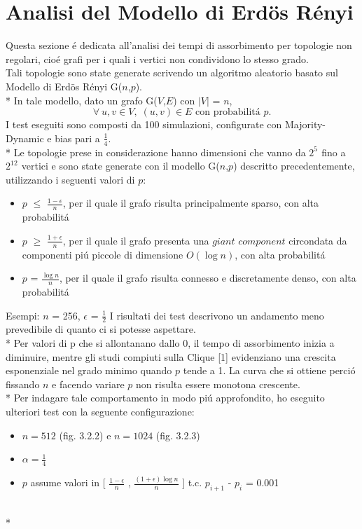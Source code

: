 \documentclass[../Tesi.tex]{subfiles}
\begin{document}
\section{Analisi del Modello di Erd{\"o}s R\'enyi}
Questa sezione \'e dedicata all'analisi dei tempi di assorbimento per topologie non regolari, cio\'e grafi per i quali i vertici non condividono lo stesso grado.\\
Tali topologie sono state generate scrivendo un algoritmo aleatorio basato sul Modello di Erd{\"o}s R\'enyi G($n$,$p$).\\*
In tale modello, dato un grafo G($V$,$E$) con $|V|$ = $n$,
\begin{equation}
    \forall \: u,v \in V,\; (u,v) \in E  \text{ con probabilit\'a } p.
\end{equation}
I test eseguiti sono composti da 100 simulazioni, configurate con Majority-Dynamic e bias pari a $\frac{1}{4}$.\\*
Le topologie prese in considerazione hanno dimensioni che vanno da $2^{5^{\mathrm{}}}$ fino a $2^{12^{\mathrm{}}}$ vertici e sono state generate con il modello G($n$,$p$) descritto precedentemente, utilizzando i seguenti valori di $p$:
\begin{itemize}
\item $p$ $\leq$ $\frac{1-\epsilon}{n}$, per il quale il grafo risulta principalmente sparso, con alta probabilit\'a
\item $p$ $\geq$ $\frac{1+\epsilon}{n}$, per il quale il grafo presenta una $giant$ $component$ circondata da componenti pi\'u piccole di dimensione $O(\log{}n)$, con alta probabilit\'a
\item $p$ = $\frac{\log{}n}{n}$, per il quale il grafo risulta connesso e discretamente denso, con alta probabilit\'a
\end{itemize}
Esempi: $n$ = 256, $\epsilon$ = $\frac{1}{2}$
I risultati dei test descrivono un andamento meno prevedibile di quanto ci si potesse aspettare.\\*
Per valori di p che si allontanano dallo 0, il tempo di assorbimento inizia a diminuire, mentre gli studi compiuti sulla Clique [1] evidenziano una crescita esponenziale nel grado minimo quando $p$ tende a 1. La curva che si ottiene perci\'o fissando $n$ e facendo variare $p$ non risulta essere monotona crescente.\\*
Per indagare tale comportamento in modo pi\'u approfondito, ho eseguito ulteriori test con la seguente configurazione:
\begin{itemize}
    \item $n=512$ (fig. 3.2.2) e $n=1024$ (fig. 3.2.3)
    \item $\alpha=\frac{1}{4}$
    \item $p$ assume valori in [ $\frac{1-\epsilon}{n}$ , $\frac{{(1+\epsilon)}\log{}n}{n}$ ] t.c. $p_{i+1}$ - $p_{i}$ = 0.001
\end{itemize}\\*
\end{document}

